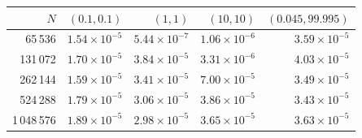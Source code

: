 \begin{tabular}{rrrrr}
\toprule
$N$ & $(0.1,0.1)$ & $(1,1)$ & $(10,10)$ & $(0.045,99.995)$ \\
\midrule
65\,536 & $1.54\times10^{-5}$ & $5.44\times10^{-7}$ & $1.06\times10^{-6}$ & $3.59\times10^{-5}$ \\
131\,072 & $1.70\times10^{-5}$ & $3.84\times10^{-5}$ & $3.31\times10^{-6}$ & $4.03\times10^{-5}$ \\
262\,144 & $1.59\times10^{-5}$ & $3.41\times10^{-5}$ & $7.00\times10^{-5}$ & $3.49\times10^{-5}$ \\
524\,288 & $1.79\times10^{-5}$ & $3.06\times10^{-5}$ & $3.86\times10^{-5}$ & $3.43\times10^{-5}$ \\
1\,048\,576 & $1.89\times10^{-5}$ & $2.98\times10^{-5}$ & $3.65\times10^{-5}$ & $3.63\times10^{-5}$ \\
\bottomrule
\end{tabular}
